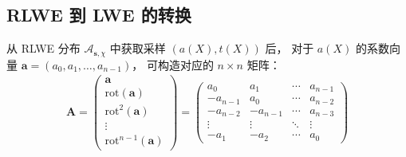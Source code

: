 \documentclass[12pt,a4paper]{article}
\numberwithin{equation}{section}
\begin{document}


\subsection{RLWE 到 LWE 的转换}
从 RLWE 分布 $\mathcal{A}_{\mathbf{s},\chi}$ 中获取采样 $(a(X), t(X))$ 后，
对于 $a(X)$ 的系数向量 $\mathbf{a} = (a_0, a_1, \ldots , a_{n-1})$，
可构造对应的 $n \times n$ 矩阵：
\begin{align}
    \mathbf{A} = \begin{pmatrix}
        \mathbf{a} \\
        \mathrm{rot}(\mathbf{a}) \\
        \mathrm{rot}^2(\mathbf{a}) \\
        \vdots \\
        \mathrm{rot}^{n-1}(\mathbf{a})
    \end{pmatrix} 
    = 
    \begin{pmatrix}
        a_0 & a_1 & \cdots & a_{n-1} \\ 
        -a_{n-1} & a_0 & \cdots & a_{n-2} \\ 
        -a_{n-2} & -a_{n-1} & \cdots & a_{n-3} \\ 
        \vdots & \vdots & \ddots & \vdots \\ 
        -a_1 & -a_2 & \cdots & a_0
    \end{pmatrix}
\end{align}
\end{document}
